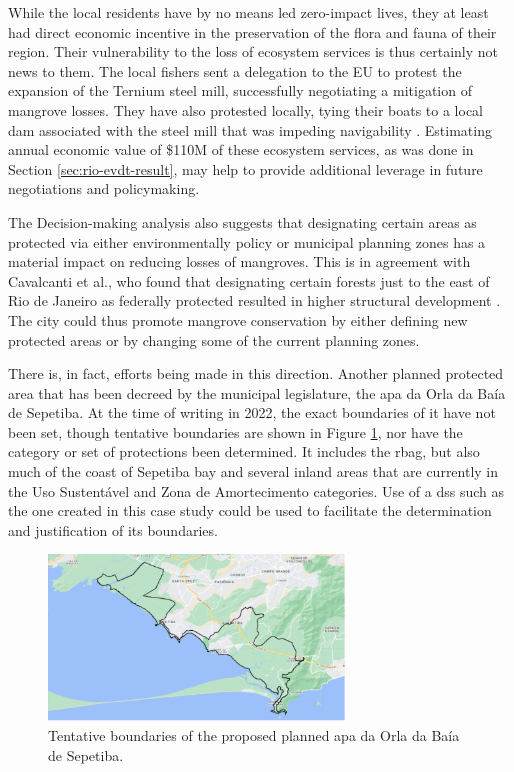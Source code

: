 While the local residents have by no means led zero-impact lives, they at least had direct economic incentive in the preservation of the flora and fauna of their region. Their vulnerability to the loss of ecosystem services is thus certainly not news to them. The local fishers sent a delegation to the EU to protest the expansion of the Ternium steel mill, successfully negotiating a mitigation of mangrove losses. They have also protested locally, tying their boats to a local dam associated with the steel mill that was impeding navigability \cite{institutopacsSemPeixeSem2021}. Estimating annual economic value of \$110M of these ecosystem services, as was done in Section \ref{sec:rio-evdt-result}, may help to provide additional leverage in future negotiations and policymaking.

The Decision-making analysis also suggests that designating certain areas as protected via either environmentally policy or municipal planning zones has a material impact on reducing losses of mangroves. This is in agreement with Cavalcanti et al., who found that designating certain forests just to the east of Rio de Janeiro as federally protected resulted in higher structural development \cite{cavalcantiEvaluatingMangroveConservation2009}. The city could thus promote mangrove conservation by either defining new protected areas or by changing some of the current planning zones.

There is, in fact, efforts being made in this direction. Another planned protected area that has been decreed by the municipal legislature, the \ac{apa} da Orla da Baía de Sepetiba. At the time of writing in 2022, the exact boundaries of it have not been set, though tentative boundaries are shown in Figure \ref{fig:apa_sepetiba}, nor have the category or set of protections been determined. It includes the \ac{rbag}, but also much of the coast of Sepetiba bay and several inland areas that are currently in the Uso Sustentável and Zona de Amortecimento categories. Use of a \ac{dss} such as the one created in this case study could be used to facilitate the determination and justification of its boundaries.

\begin{figure}[!htb] 
\centering
\includegraphics[width=0.7\textwidth]{Figures/chap4/apa_sepetiba.png}
\caption[APA da Orla da Baía de Sepetiba]{Tentative boundaries of the proposed planned \ac{apa} da Orla da Baía de Sepetiba.}
\label{fig:apa_sepetiba}
\end{figure}

